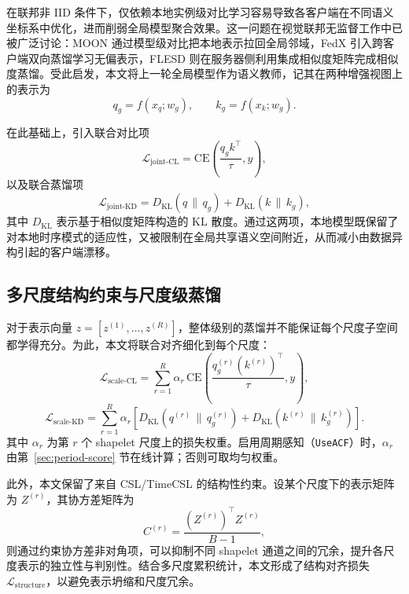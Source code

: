 \documentclass{article}
\begin{document}
在联邦非 IID 条件下，仅依赖本地实例级对比学习容易导致各客户端在不同语义坐标系中优化，进而削弱全局模型聚合效果\cite{fedu2}。这一问题在视觉联邦无监督工作中已被广泛讨论：MOON 通过模型级对比把本地表示拉回全局邻域\cite{moon}，FedX 引入跨客户端双向蒸馏学习无偏表示\cite{fedx}，FLESD 则在服务器侧利用集成相似度矩阵完成相似度蒸馏\cite{flesd}。受此启发，本文将上一轮全局模型作为语义教师，记其在两种增强视图上的表示为
\begin{equation}
q_g = f(x_q; w_g),\qquad k_g = f(x_k; w_g).
\end{equation}

在此基础上，引入联合对比项
\begin{equation}
\mathcal{L}_{\text{joint-CL}} = \mathrm{CE}\left(\frac{q_gk^\top}{\tau}, y\right),
\end{equation}
以及联合蒸馏项
\begin{equation}
\mathcal{L}_{\text{joint-KD}} = D_{\mathrm{KL}}(q \,\|\, q_g) + D_{\mathrm{KL}}(k \,\|\, k_g),
\end{equation}
其中 $D_{\mathrm{KL}}$ 表示基于相似度矩阵构造的 KL 散度。通过这两项，本地模型既保留了对本地时序模式的适应性，又被限制在全局共享语义空间附近，从而减小由数据异构引起的客户端漂移。

\subsection{多尺度结构约束与尺度级蒸馏}

对于表示向量 $z=[z^{(1)},\dots,z^{(R)}]$，整体级别的蒸馏并不能保证每个尺度子空间都学得充分。为此，本文将联合对齐细化到每个尺度：
\begin{equation}
\mathcal{L}_{\text{scale-CL}} = \sum_{r=1}^{R}\alpha_r \,
\mathrm{CE}\left(\frac{q_g^{(r)}(k^{(r)})^\top}{\tau}, y\right),
\label{eq:scale-cl}
\end{equation}
\begin{equation}
\mathcal{L}_{\text{scale-KD}} = \sum_{r=1}^{R}\alpha_r \left[
D_{\mathrm{KL}}\left(q^{(r)} \,\|\, q_g^{(r)}\right)+
D_{\mathrm{KL}}\left(k^{(r)} \,\|\, k_g^{(r)}\right)\right].
\end{equation}
其中 $\alpha_r$ 为第 $r$ 个 shapelet 尺度上的损失权重。启用周期感知（\texttt{UseACF}）时，$\alpha_r$ 由第~\ref{sec:period-score} 节在线计算；否则可取均匀权重。

此外，本文保留了来自 CSL/TimeCSL 的结构性约束。设某个尺度下的表示矩阵为 $Z^{(r)}$，其协方差矩阵为
\begin{equation}
C^{(r)} = \frac{\left(Z^{(r)}\right)^\top Z^{(r)}}{B-1},
\end{equation}
则通过约束协方差非对角项，可以抑制不同 shapelet 通道之间的冗余，提升各尺度表示的独立性与判别性。结合多尺度累积统计，本文形成了结构对齐损失 $\mathcal{L}_{\text{structure}}$，以避免表示坍缩和尺度冗余。
\end{document}

